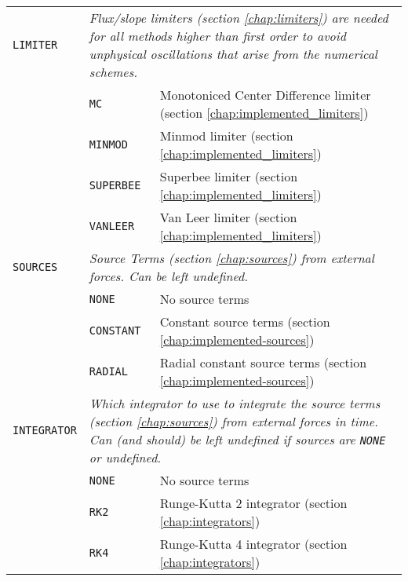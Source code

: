 \begin{center}
\begin{tabular}{l p{4cm} p{8cm}}
\texttt{LIMITER}		&	\multicolumn{2}{p{13cm}}{\textit{%
							Flux/slope limiters (section \ref{chap:limiters})  are needed for all methods 
							higher than first order to avoid unphysical oscillations that arise from the 
							numerical schemes.}}\\
						&	\texttt{MC}					&	Monotoniced Center Difference limiter (section \ref{chap:implemented_limiters}) \\
						&	\texttt{MINMOD}				&	Minmod limiter (section \ref{chap:implemented_limiters}) \\
						&	\texttt{SUPERBEE}			&	Superbee limiter (section \ref{chap:implemented_limiters}) \\
						&	\texttt{VANLEER}			&	Van Leer limiter (section \ref{chap:implemented_limiters}) \\
\hline


\texttt{SOURCES}		&	\multicolumn{2}{p{13cm}}{\textit{%
							Source Terms (section \ref{chap:sources}) from external forces. Can be left undefined.}} \\
						&	\texttt{NONE}				&	No source terms  \\
						&	\texttt{CONSTANT}			&	Constant source terms (section \ref{chap:implemented-sources}) \\
						&	\texttt{RADIAL}				&	Radial constant source terms (section \ref{chap:implemented-sources}) \\
\hline

\texttt{INTEGRATOR}		&	\multicolumn{2}{p{13cm}}{\textit{%
							Which integrator to use to integrate the source terms (section \ref{chap:sources}) from external forces in time. Can (and should) be left undefined if sources are \texttt{NONE} or undefined.}} \\
						&	\texttt{NONE}				&	No source terms  \\
						&	\texttt{RK2}				&	Runge-Kutta 2 integrator (section \ref{chap:integrators}) \\
						&	\texttt{RK4}				&	Runge-Kutta 4 integrator (section \ref{chap:integrators}) \\
\hline

\end{tabular}
\end{center}











